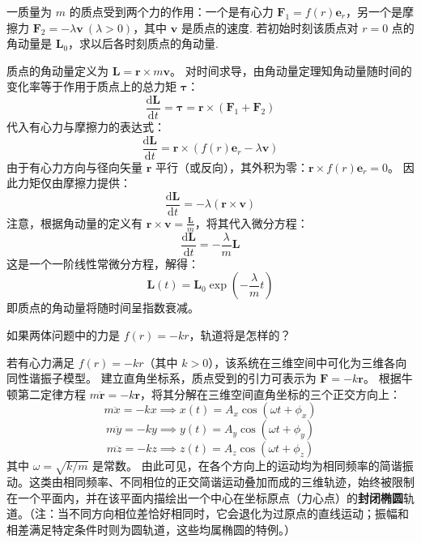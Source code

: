 \begin{exercise}\label{ex:4.13}
一质量为 $m$ 的质点受到两个力的作用：一个是有心力 $\boldsymbol{F}_1 = f(r)\boldsymbol{e}_r$，另一个是摩擦力 $\boldsymbol{F}_2 = -\lambda \boldsymbol{v} \ (\lambda > 0)$，其中 $\boldsymbol{v}$ 是质点的速度. 若初始时刻该质点对 $r=0$ 点的角动量是 $\boldsymbol{L}_0$，求以后各时刻质点的角动量.
\end{exercise}
\begin{solution}
质点的角动量定义为 $\boldsymbol{L} = \boldsymbol{r} \times m\boldsymbol{v}$。
对时间求导，由角动量定理知角动量随时间的变化率等于作用于质点上的总力矩 $\boldsymbol{\tau}$：
$$ \frac{\mathrm{d}\boldsymbol{L}}{\mathrm{d}t} = \boldsymbol{\tau} = \boldsymbol{r} \times (\boldsymbol{F}_1 + \boldsymbol{F}_2) $$
代入有心力与摩擦力的表达式：
$$ \frac{\mathrm{d}\boldsymbol{L}}{\mathrm{d}t} = \boldsymbol{r} \times (f(r)\boldsymbol{e}_r - \lambda \boldsymbol{v}) $$
由于有心力方向与径向矢量 $\boldsymbol{r}$ 平行（或反向），其外积为零：$\boldsymbol{r} \times f(r)\boldsymbol{e}_r = 0$。
因此力矩仅由摩擦力提供：
$$ \frac{\mathrm{d}\boldsymbol{L}}{\mathrm{d}t} = -\lambda (\boldsymbol{r} \times \boldsymbol{v}) $$
注意，根据角动量的定义有 $\boldsymbol{r} \times \boldsymbol{v} = \frac{\boldsymbol{L}}{m}$，将其代入微分方程：
$$ \frac{\mathrm{d}\boldsymbol{L}}{\mathrm{d}t} = -\frac{\lambda}{m} \boldsymbol{L} $$
这是一个一阶线性常微分方程，解得：
$$ \boldsymbol{L}(t) = \boldsymbol{L}_0 \exp\left(-\frac{\lambda}{m}t\right) $$
即质点的角动量将随时间呈指数衰减。
\end{solution}

\begin{exercise}\label{ex:4.14}
如果两体问题中的力是 $f(r) = -kr$，轨道将是怎样的？
\end{exercise}
\begin{solution}
若有心力满足 $f(r) = -kr$（其中 $k > 0$），该系统在三维空间中可化为三维各向同性谐振子模型。
建立直角坐标系，质点受到的引力可表示为 $\boldsymbol{F} = -k\boldsymbol{r}$。
根据牛顿第二定律方程 $m\ddot{\boldsymbol{r}} = -k\boldsymbol{r}$，将其分解在三维空间直角坐标的三个正交方向上：
$$ m\ddot{x} = -kx \implies x(t) = A_x \cos(\omega t + \phi_x) $$
$$ m\ddot{y} = -ky \implies y(t) = A_y \cos(\omega t + \phi_y) $$
$$ m\ddot{z} = -kz \implies z(t) = A_z \cos(\omega t + \phi_z) $$
其中 $\omega = \sqrt{k/m}$ 是常数。
由此可见，在各个方向上的运动均为相同频率的简谐振动。这类由相同频率、不同相位的正交简谐运动叠加而成的三维轨迹，始终被限制在一个平面内，并在该平面内描绘出一个中心在坐标原点（力心点）的\textbf{封闭椭圆}轨道。（注：当不同方向相位差恰好相同时，它会退化为过原点的直线运动；振幅和相差满足特定条件时则为圆轨道，这些均属椭圆的特例。）
\end{solution}

